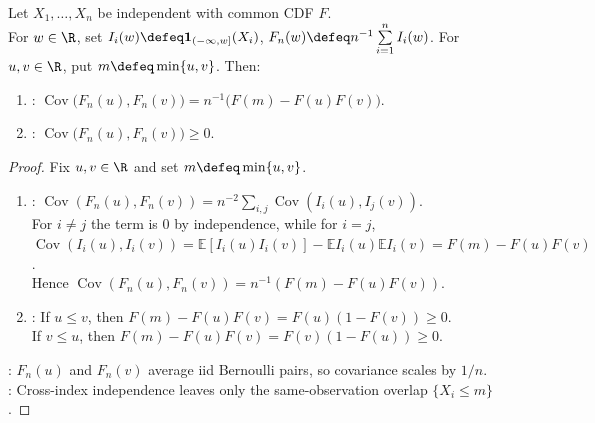 \begin{proposition} \label{prop:ecdf-two-point-covariance} \\
Let $X_1,\ldots,X_n$ be independent with common CDF $F$.\\
For $w\in\R$, set $I_i(w)\defeq\mathbf{1}_{(-\infty,w]}(X_i)$, $F_n(w)\defeq n^{-1}\sum\limits_{i=1}^n I_i(w)$. For $u,v\in\R$, put $m\defeq\min\{u,v\}$. Then:
\begin{enumerate}[label=(\roman*)]
\setlength{\itemsep}{0pt}
\item {}: $\operatorname{Cov}\bigl(F_n(u),F_n(v)\bigr)=n^{-1}\bigl(F(m)-F(u)F(v)\bigr)$.
\item {}: $\operatorname{Cov}\bigl(F_n(u),F_n(v)\bigr)\geq0$.
\end{enumerate}
\begin{proof}
Fix $u,v\in\R$ and set $m\defeq\min\{u,v\}$.
\begin{enumerate}[label=(\roman*)]
\setlength{\itemsep}{0pt}
\item {}: $\operatorname{Cov}(F_n(u),F_n(v))=n^{-2}\sum\limits_{i,j}\operatorname{Cov}(I_i(u),I_j(v))$.\\
For $i\neq j$ the term is $0$ by independence, while for $i=j$,\\
$\operatorname{Cov}(I_i(u),I_i(v))=\mathbb{E}[I_i(u)I_i(v)]-\mathbb{E}I_i(u)\mathbb{E}I_i(v)=F(m)-F(u)F(v)$.\\
Hence $\operatorname{Cov}(F_n(u),F_n(v))=n^{-1}(F(m)-F(u)F(v))$.
\item {}: If $u\leq v$, then $F(m)-F(u)F(v)=F(u)(1-F(v))\geq0$.\\
If $v\leq u$, then $F(m)-F(u)F(v)=F(v)(1-F(u))\geq0$.
\end{enumerate}
: $F_n(u)$ and $F_n(v)$ average iid Bernoulli pairs, so covariance scales by $1/n$.\\
: Cross-index independence leaves only the same-observation overlap $\{X_i\leq m\}$.
\end{proof}
\end{proposition}

